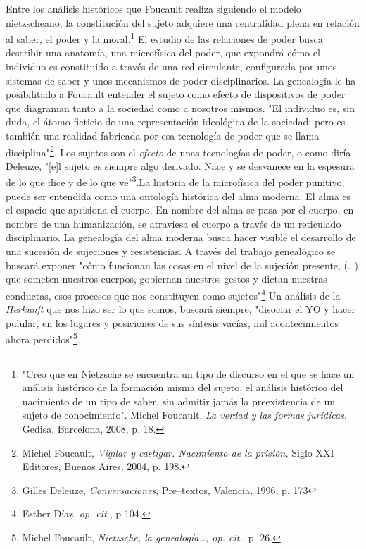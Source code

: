 \documentclass{book}
\begin{document}
Entre los análisis históricos que Foucault realiza siguiendo el modelo
nietzscheano, la constitución del sujeto adquiere una centralidad plena
en relación al saber, el poder y la moral.\footnote{"Creo que en
  Nietzsche se encuentra un tipo de discurso en el que se hace un
  análisis histórico de la formación misma del sujeto, el análisis
  histórico del nacimiento de un tipo de saber, sin admitir jamás la
  preexistencia de un sujeto de conocimiento". Michel Foucault, \emph{La
  verdad y las formas jurídicas}, Gedisa, Barcelona, 2008, p. 18.} El
estudio de las relaciones de poder busca describir una anatomía, una
microfísica del poder, que expondrá cómo el individuo es constituido a
través de una red circulante, configurada por unos sistemas de saber y
unos mecanismos de poder disciplinarios. La genealogía le ha
posibilitado a Foucault entender el sujeto como efecto de dispositivos
de poder que diagraman tanto a la sociedad como a nosotros mismos. "El
individuo es, sin duda, el átomo ficticio de una representación
ideológica de la sociedad; pero es también una realidad fabricada por
esa tecnología de poder que se llama disciplina"\footnote{Michel
  Foucault, \emph{Vigilar y castigar. Nacimiento de la prisión,} Siglo
  XXI Editores, Buenos Aires, 2004, p. 198.}. Los sujetos son el
\emph{efecto} de unas tecnologías de poder, o como diría Deleuze,
"{[}e{]}l sujeto es siempre algo derivado. Nace y se desvanece en la
espesura de lo que dice y de lo que ve"\footnote{Gilles Deleuze,
  \emph{Conversaciones}, Pre--textos, Valencia, 1996, p. 173}.La
historia de la microfísica del poder punitivo, puede ser entendida como
una ontología histórica del alma moderna. El alma es el espacio que
aprisiona el cuerpo. En nombre del alma se pasa por el cuerpo, en nombre
de una humanización, se atraviesa el cuerpo a través de un reticulado
disciplinario. La genealogía del alma moderna busca hacer visible el
desarrollo de una sucesión de sujeciones y resistencias. A través del
trabajo genealógico se buscará exponer "cómo funcionan las cosas en el
nivel de la sujeción presente, (\dots) que someten nuestros
cuerpos, gobiernan nuestros gestos y dictan nuestras conductas, esos
procesos que nos constituyen como sujetos"\footnote{Esther Díaz,
  \emph{op. cit}., p 104.} Un análisis de la \emph{Herkunft} que nos
hizo ser lo que somos, buscará siempre, "disociar el YO y hacer pulular,
en los lugares y posiciones de sus síntesis vacías, mil acontecimientos
ahora perdidos"\footnote{Michel Foucault, \emph{Nietzsche, la
  genealogía\ldots, op. cit}., p. 26.}.
\end{document}
